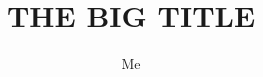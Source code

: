 \documentclass{beamer}
\title[]{THE BIG TITLE}
\author[]{Me}
\date{}
\begin{document}
\begin{frame}
\titlepage %
\end{frame}
\end{document}
